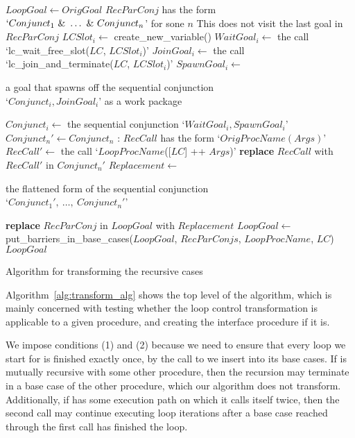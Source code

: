 \begin{algorithm}[tbp]
\begin{algorithmic}
  \State $LoopGoal \gets OrigGoal$
    \State $RecParConj$ has the form $`Conjunct_1~\&~\ldots~\&~Conjunct_n$'
        for sone $n$
      \Comment This does not visit the last goal in $RecParConj$
      \State $LCSlot_i \gets$ create\_new\_variable()
      \State $WaitGoal_i \gets$ the call
        `lc\_wait\_free\_slot($LC$, $LCSlot_i$)'
      \State $JoinGoal_i \gets$ the call
        `lc\_join\_and\_terminate($LC$, $LCSlot_i$)'
      \State $SpawnGoal_i \gets$ \parbox{0.7\textwidth}{a goal
        that spawns off the sequential conjunction \\
        `$Conjunct_i, JoinGoal_i$' as a work package}
      \State $Conjunct_i \gets$ the sequential conjunction
        `$WaitGoal_i, SpawnGoal_i$'
    \EndFor
    \State $Conjunct_n' \gets Conjunct_n$
    :
      \State $RecCall$ has the form `$OrigProcName(Args)$'
      \State $RecCall' \gets$ the call
        `$LoopProcName$([$LC$] ++ $Args$)'
      \State \textbf{replace} $RecCall$ with $RecCall'$ in $Conjunct_n'$
    \EndFor
    \State $Replacement \gets$ \parbox{0.7\textwidth}{the flattened form
      of the sequential conjunction \\
      `$Conjunct_1',~\ldots,~Conjunct_n'$'}
    \State \textbf{replace} $RecParConj$ in $LoopGoal$ with $Replacement$
  \EndFor
  \State $LoopGoal \gets$ put\_barriers\_in\_base\_cases($LoopGoal$,
    $RecParConjs$, $LoopProcName$, $LC$)
  \State \Return $LoopGoal$
\EndProcedure
\end{algorithmic}
\caption{Algorithm for transforming the recursive cases}
\label{alg:reccases_alg}
\end{algorithm}

Algorithm~\ref{alg:transform_alg} shows the top level of the algorithm,
which is mainly concerned with testing
whether the loop control transformation is applicable to a given procedure,
and creating the interface procedure if it is.

We impose conditions (1) and (2) because we need to ensure
that every loop we start for  is finished exactly once,
by the call to \lcfinish we insert into its base cases.
If  is mutually recursive with some other procedure,
then the recursion may terminate in a base case of the other procedure,
which our algorithm does not transform.
Additionally, if  has some execution path on which it calls
itself twice,
then the second call may continue executing loop iterations
after a base case reached through the first call has finished the loop.

